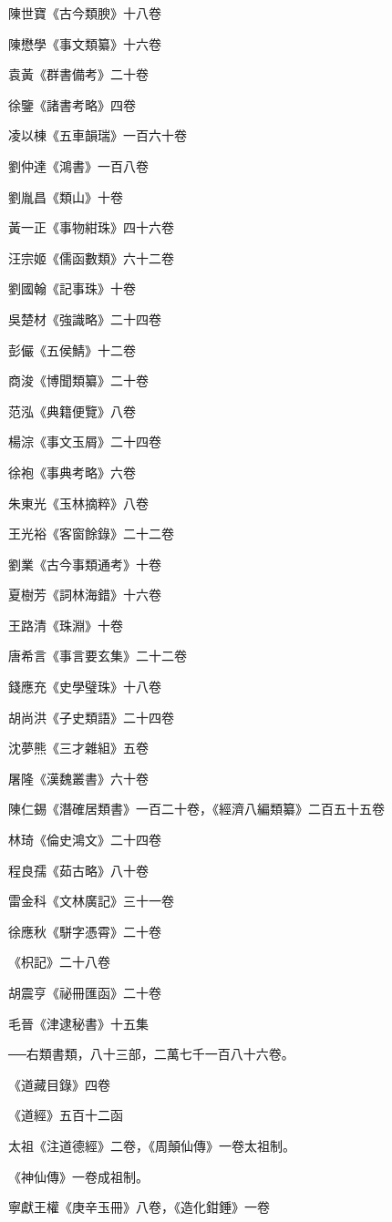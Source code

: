 陳世寶《古今類腴》十八卷

陳懋學《事文類纂》十六卷

袁黃《群書備考》二十卷

徐鑒《諸書考略》四卷

凌以棟《五車韻瑞》一百六十卷

劉仲達《鴻書》一百八卷

劉胤昌《類山》十卷

黃一正《事物紺珠》四十六卷

汪宗姬《儒函數類》六十二卷

劉國翰《記事珠》十卷

吳楚材《強識略》二十四卷

彭儼《五侯鯖》十二卷

商浚《博聞類纂》二十卷

范泓《典籍便覽》八卷

楊淙《事文玉屑》二十四卷

徐袍《事典考略》六卷

朱東光《玉林摘粹》八卷

王光裕《客窗餘錄》二十二卷

劉業《古今事類通考》十卷

夏樹芳《詞林海錯》十六卷

王路清《珠淵》十卷

唐希言《事言要玄集》二十二卷

錢應充《史學璧珠》十八卷

胡尚洪《子史類語》二十四卷

沈夢熊《三才雜組》五卷

屠隆《漢魏叢書》六十卷

陳仁錫《潛確居類書》一百二十卷，《經濟八編類纂》二百五十五卷

林琦《倫史鴻文》二十四卷

程良孺《茹古略》八十卷

雷金科《文林廣記》三十一卷

徐應秋《駢字憑霄》二十卷

《枳記》二十八卷

胡震亨《祕冊匯函》二十卷

毛晉《津逮秘書》十五集

──右類書類，八十三部，二萬七千一百八十六卷。

《道藏目錄》四卷

《道經》五百十二函

太祖《注道德經》二卷，《周顛仙傳》一卷太祖制。

《神仙傳》一卷成祖制。

寧獻王權《庚辛玉冊》八卷，《造化鉗錘》一卷

